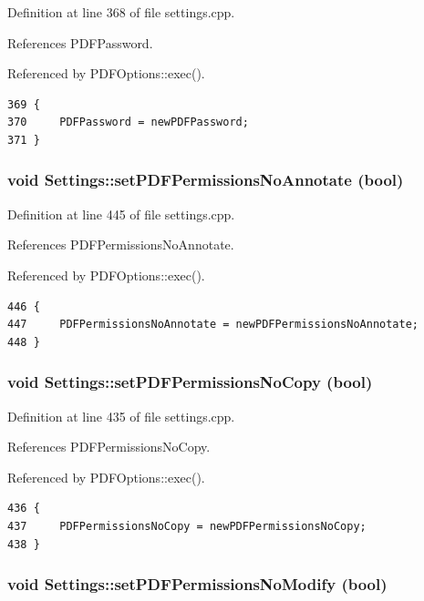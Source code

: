 Definition at line 368 of file settings.cpp.

References PDFPassword.

Referenced by PDFOptions::exec().

\footnotesize\begin{verbatim}369 {
370     PDFPassword = newPDFPassword;
371 }
\end{verbatim}\normalsize 


\hypertarget{classSettings_a57}{
\subsubsection[setPDFPermissionsNoAnnotate]{\setlength{\rightskip}{0pt plus 5cm}void Settings::set\-PDFPermissions\-No\-Annotate (bool)}}
\label{classSettings_a57}


Definition at line 445 of file settings.cpp.

References PDFPermissions\-No\-Annotate.

Referenced by PDFOptions::exec().

\footnotesize\begin{verbatim}446 {
447     PDFPermissionsNoAnnotate = newPDFPermissionsNoAnnotate;
448 }       
\end{verbatim}\normalsize 


\hypertarget{classSettings_a55}{
\subsubsection[setPDFPermissionsNoCopy]{\setlength{\rightskip}{0pt plus 5cm}void Settings::set\-PDFPermissions\-No\-Copy (bool)}}
\label{classSettings_a55}


Definition at line 435 of file settings.cpp.

References PDFPermissions\-No\-Copy.

Referenced by PDFOptions::exec().

\footnotesize\begin{verbatim}436 {
437     PDFPermissionsNoCopy = newPDFPermissionsNoCopy;
438 }
\end{verbatim}\normalsize 


\hypertarget{classSettings_a53}{
\subsubsection[setPDFPermissionsNoModify]{\setlength{\rightskip}{0pt plus 5cm}void Settings::set\-PDFPermissions\-No\-Modify (bool)}}
\label{classSettings_a53}


